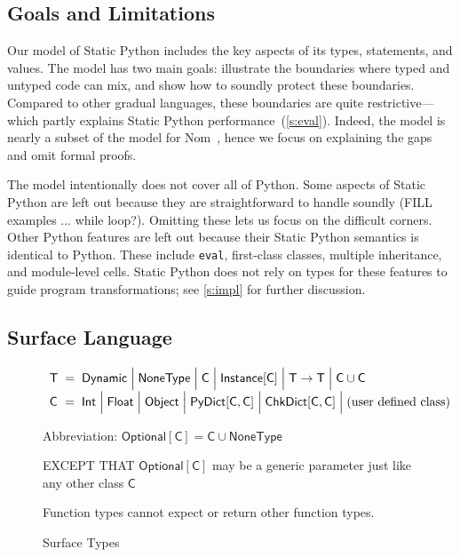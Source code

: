 \documentclass[english,cleveref,submission]{programming}
\makeatletter
\newcommand{\SP}{Static Python}
\newcommand{\code}[1]{\texttt{#1}}
\newcommand{\defeq}{=}
\newcommand{\langmid}{\mathrel{\mathbf{\Big\vert}}}
\newenvironment{langarray}{\(\def\arraystretch{1.5}\begin{array}{l@{\hspace{2mm}}c@{\hspace{2mm}}l}}{\end{array}\)}
\newcommand{\typefont}[1]{\mathsf{#1}}
\newcommand{\paramtype}[2]{#1[#2]}
\newcommand{\sptype}{\typefont{T}}
\newcommand{\sptclass}{\typefont{C}}
\newcommand{\sptint}{\typefont{Int}}
\newcommand{\sptfloat}{\typefont{Float}}
\newcommand{\sptdyn}{\typefont{Dynamic}}
\newcommand{\sptobject}{\typefont{Object}}
\newcommand{\sptnone}{\typefont{NoneType}}
\newcommand{\sptinstanceof}[1]{\paramtype{\typefont{Instance}}{#1}}
\newcommand{\sptfun}[2]{#1 \rightarrow #2}
\newcommand{\sptunion}[2]{#1 \cup #2}
\newcommand{\sptoptional}[1]{\paramtype{\typefont{Optional}}{#1}}
\newcommand{\sptrawpydict}{\typefont{PyDict}}
\newcommand{\sptpydict}[2]{\paramtype{\sptrawpydict}{#1, #2}}
\newcommand{\sptchkdict}[2]{\paramtype{\typefont{ChkDict}}{#1, #2}}
\makeatother
\begin{document}
\subsection{Goals and Limitations}

Our model of \SP{} includes the key aspects of its types,
statements, and values.
The model has two main goals:
illustrate the boundaries where typed and untyped code can mix,
and show how to soundly protect these boundaries.
Compared to other gradual languages, these boundaries are quite restrictive---which
partly explains \SP{} performance~(\cref{s:eval}).
Indeed, the model is nearly a subset of the model for Nom~\cite{mt-oopsla-2021},
hence we focus on explaining the gaps and omit formal proofs.

The model intentionally does not cover all of Python.
Some aspects of \SP{} are left out because they are straightforward to
handle soundly (FILL examples ... while loop?).
Omitting these lets us focus on the difficult corners.
Other Python features are left out because their \SP{} semantics is identical
to Python.
These include \code{eval}, first-class classes, multiple inheritance, and module-level cells.
\SP{} does not rely on types for these features to guide program transformations;
see \cref{s:impl} for further discussion.


\subsection{Surface Language}

\begin{figure}[t]
  \begin{langarray}
    \sptype & \defeq &
      \sptdyn \langmid
      \sptnone \langmid
      \sptclass \langmid
      \sptinstanceof{\sptclass} \langmid
      \sptfun{\sptype}{\sptype} \langmid
      \sptunion{\sptclass}{\sptclass}
  \\
    \sptclass & \defeq &
      \sptint \langmid
      \sptfloat \langmid
      \sptobject \langmid
      \sptpydict{\sptclass}{\sptclass} \langmid
      \sptchkdict{\sptclass}{\sptclass} \langmid
      \mbox{(user defined class)}
  \end{langarray}

  \begin{center}\parbox{0.8\columnwidth}{
    Abbreviation: $\sptoptional{\sptclass} \defeq \sptunion{\sptclass}{\sptnone}$

    EXCEPT THAT $\sptoptional{\sptclass}$ may be a generic parameter just like any other class $\sptclass$

    Function types cannot expect or return other function types.
  }\end{center}

  \caption{Surface Types}
  \label{f:surface-types}
\end{figure}
\end{document}
